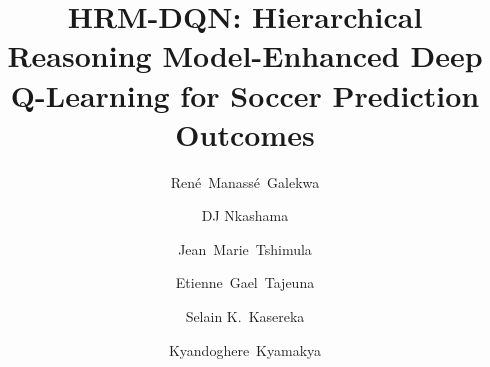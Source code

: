 \documentclass[3p,times,procedia]{elsarticle}
\begin{document}
\begin{frontmatter}



%

\title{HRM-DQN: Hierarchical Reasoning Model-Enhanced Deep Q-Learning for Soccer Prediction Outcomes}




\author[a,b]{René~Manassé~Galekwa}
\author[c]{DJ Nkashama}
\author[b,e]{Jean~Marie~Tshimula}
\author[d]{Etienne~Gael~Tajeuna}
\author[a,b]{Selain K.~Kasereka}
\author[a]{Kyandoghere~Kyamakya}

\address[a]{Institute of Smart Systems Technologies, University of Klagenfurt, 9020 Klagenfurt am Wörthersee, Austria}
\address[b]{Mathematics, Statistics and Computer Science Department, University of Kinshasa, Kinshasa, DR Congo}
\address[c]{Department of Computer Science, Université de Sherbrooke, QC J1K 2R1, Canada}
\address[d]{Department of Computer Science and Engineering, Université du Québec en Outaouais, QC J8X 3X7, Canada}
\address[e]{Applied Artificial Intelligence Institute, Université TÉLUQ, Montreal, Canada}


\end{frontmatter}
\end{document}
